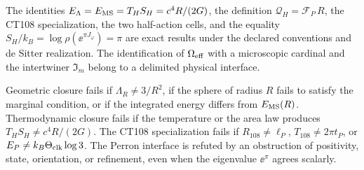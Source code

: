 \begin{proofstatusbox}
The identities
\(E_\Lambda=E_{\rm MS}=T_HS_H=c^4R/(2G)\), the definition
\(\mathcal Q_H=\mathscr F_P\,R\), the CT108 specialization, the two
half-action cells, and the equality
\(S_H/k_B=\log\rho(\ee^{\pi J_\varphi})=\pi\) are exact results under
the declared conventions and de Sitter realization. The identification
of \(\Omega_{\rm eff}\) with a microscopic cardinal and the intertwiner
\(\mathfrak I_m\) belong to a delimited physical interface.
\end{proofstatusbox}


\begin{falsifierbox}
Geometric closure fails if \(\Lambda_R\ne3/R^2\), if the sphere of
radius \(R\) fails to satisfy the marginal condition, or if the integrated energy differs from
\(E_{\rm MS}(R)\). Thermodynamic closure fails if the temperature or the
area law produces \(T_HS_H\ne c^4R/(2G)\). The CT108 specialization
fails if \(R_{108}\ne\ell_P\), \(T_{108}\ne2\pi t_P\), or
\(E_P\ne k_B\Theta_{\rm clk}\log3\). The Perron interface is refuted by
an obstruction of positivity, state, orientation, or refinement, even
when the eigenvalue \(\ee^\pi\) agrees scalarly.
\end{falsifierbox}
